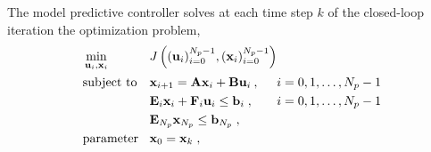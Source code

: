 The model predictive controller solves at each time step $k$ of the closed-loop iteration the optimization problem, 
\begin{equation}
  \label{eq:MPCoptim}
  \begin{alignedat}{3}
&\min_{\mathbf{u}_{i},\mathbf{x}_{i}} && J\left((\mathbf{u}_{i})_{i=0}^{N_p-1}, (\mathbf{x}_{i})_{i=0}^{N_p-1}\right) && \\
&\textup{subject to} \quad &&\mathbf{x}_{i+1}  = \mathbf{Ax}_{i} + \textbf{Bu}_{i} \:, && i = 0,1,\dots,N_p-1\\
& &&\mathbf{E}_{i}\mathbf{x}_{i} + \mathbf{F}_{i}\mathbf{u}_{i} \leq \mathbf{b}_{i} \;, &&  i = 0,1,\dots,N_p-1\\
& &&\mathbf{E}_{N_p}\mathbf{x}_{N_p} \leq \mathbf{b}_{N_p} \;, &&\\
&\textup{parameter} && \mathbf{x}_0 = \mathbf{x}_k \;, &&   
\end{alignedat}
\end{equation}

